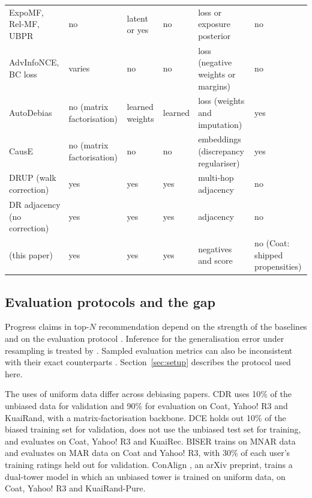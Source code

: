 \begin{table}[p]
{\begin{tabular}{p{3.2cm}p{1.9cm}p{1.8cm}p{1.6cm}p{2.6cm}p{1.8cm}}
ExpoMF, Rel-MF, UBPR & no & latent or yes & no & loss or exposure posterior & no \\
AdvInfoNCE, BC loss & varies & no & no & loss (negative weights or margins) & no \\
AutoDebias & no (matrix factorisation) & learned weights & learned & loss (weights and imputation) & yes \\
CausE & no (matrix factorisation) & no & no & embeddings (discrepancy regulariser) & yes \\
DRUP (walk correction) & yes & yes & yes & multi-hop adjacency & no \\
DR adjacency (no correction) & yes & yes & yes & adjacency & no \\
\midrule
\qp{} (this paper) & yes & yes & yes & negatives and score & no (Coat: shipped propensities) \\
\bottomrule
\end{tabular}}
\end{table}

\subsection{Evaluation protocols and the gap}

Progress claims in top-$N$ recommendation depend on the strength of the baselines and on
the evaluation protocol \citep{dacrema2019progress,rendle2019baselines,anelli2023myth}.
Inference for the generalisation error under resampling is treated by \citet{nadeau2003}.
Sampled
evaluation metrics can also be inconsistent with their exact counterparts
\citep{krichene2020sampled}. Section~\ref{sec:setup} describes the protocol used here.

The uses of uniform data differ across debiasing papers. CDR \citep{song2023cdr} uses 10\%
of the unbiased data for validation and 90\% for evaluation on Coat, Yahoo! R3 and KuaiRand,
with a matrix-factorisation backbone. DCE \citep{kweon2024dce} holds out 10\% of the biased
training set for validation, does not use the unbiased test set for training, and evaluates on
Coat, Yahoo! R3 and KuaiRec. BISER \citep{lee2022biser} trains on MNAR data and evaluates on
MAR data on Coat and Yahoo! R3, with 30\% of each user's training ratings held out for
validation. ConAlign \citep{zhang2026conalign}, an arXiv preprint, trains a dual-tower model in
which an unbiased tower is trained on uniform data, on Coat, Yahoo! R3 and KuaiRand-Pure.

